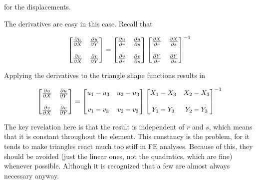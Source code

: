 for the displacements.

The derivatives are easy in this case.  Recall that

\begin{eqnarray*}
\begin{bmatrix}
{\partial u \over \partial X} & {\partial u \over \partial Y} \\
\\
{\partial v \over \partial X} & {\partial v \over \partial Y} 
\end{bmatrix}
=
\begin{bmatrix}
{\partial u \over \partial r} & {\partial u \over \partial s} \\
\\
{\partial v \over \partial r} & {\partial v \over \partial s} 
\end{bmatrix}
\begin{bmatrix}
{\partial X \over \partial r} & {\partial X \over \partial s} \\
\\
{\partial Y \over \partial r} & {\partial Y \over \partial s} 
\end{bmatrix}^{-1}
\end{eqnarray*}

Applying the derivatives to the triangle shape functions results in

\begin{eqnarray*}
\begin{bmatrix}
{\partial u \over \partial X} & {\partial u \over \partial Y} \\
\\
{\partial v \over \partial X} & {\partial v \over \partial Y} 
\end{bmatrix}
=
\begin{bmatrix}
u_1 - u_3 & u_2 - u_3 \\
\\
v_1 - v_3 & v_2 - v_3 \\
\end{bmatrix}
\begin{bmatrix}
X_1 - X_3 & X_2 - X_3 \\
\\
Y_1 - Y_3 & Y_2 - Y_3 \\
\end{bmatrix}^{-1}
\end{eqnarray*}

The key revelation here is that the result is independent of $ r $ and $ s $, which means that it is constant throughout the element. This constancy is the problem, for it tends to make triangles react much too stiff in FE analyses.  Because of this, they should be avoided (just the linear ones, not the quadratics, which are fine) whenever possible. Although it is recognized that a few are almost always necessary anyway.

